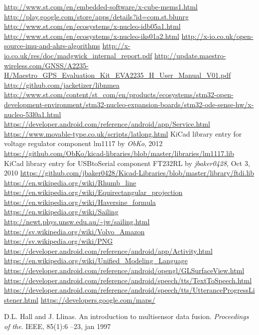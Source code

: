 \begin{thebibliography}{9}
  \url{http://www.st.com/en/embedded-software/x-cube-mems1.html}
  \url{http://play.google.com/store/apps/details?id=com.st.blunrg}
  \url{http://www.st.com/en/ecosystems/x-nucleo-idb05a1.html}
  \url{http://www.st.com/en/ecosystems/x-nucleo-iks01a2.html}
  \url{http://x-io.co.uk/open-source-imu-and-ahrs-algorithms}
  \url{http://x-io.co.uk/res/doc/madgwick_internal_report.pdf}
  \url{http://update.maestro-wireless.com/GNSS/A2235-H/Maestro_GPS_Evaluation_Kit_EVA2235_H_User_Manual_V01.pdf}
  \url{http://github.com/jacketizer/libnmea}
  \url{http://www.st.com/content/st_com/en/products/ecosystems/stm32-open-development-environment/stm32-nucleo-expansion-boards/stm32-ode-sense-hw/x-nucleo-53l0a1.html}
  \url{https://developer.android.com/reference/android/app/Service.html}
  \url{https://www.movable-type.co.uk/scripts/latlong.html}
	KiCad library entry for voltage regulator component lm1117 by \emph{ObKo}, 2012  
  \url{https://github.com/ObKo/kicad-libraries/blob/master/libraries/lm1117.lib}
	KiCad library entry for USBtoSerial component FT232RL by \emph{jbaker0428}, Oct 3, 2010
	\url{https://github.com/jbaker0428/Kicad-Libraries/blob/master/library/ftdi.lib}
  \url{https://en.wikipedia.org/wiki/Rhumb_line}
  \url{https://en.wikipedia.org/wiki/Equirectangular_projection}
  \url{https://en.wikipedia.org/wiki/Haversine_formula}
  \url{https://en.wikipedia.org/wiki/Sailing}
  \url{http://newt.phys.unsw.edu.au/~jw/sailing.html}
  \url{https://sv.wikipedia.org/wiki/Volvo_Amazon}
  \url{https://sv.wikipedia.org/wiki/PNG}
  \url{https://developer.android.com/reference/android/app/Activity.html}
  \url{https://en.wikipedia.org/wiki/Unified_Modeling_Language}
  \url{https://developer.android.com/reference/android/opengl/GLSurfaceView.html}
  \url{https://developer.android.com/reference/android/speech/tts/TextToSpeech.html}
  \url{https://developer.android.com/reference/android/speech/tts/UtteranceProgressListener.html}
  \url{https://developers.google.com/maps/}

D.L. Hall and J. Llinas. An introduction to multisensor data fusion. 
\textit{Proceedings of the}. IEEE, 85(1):6 –23, jan 1997


\end{thebibliography}
